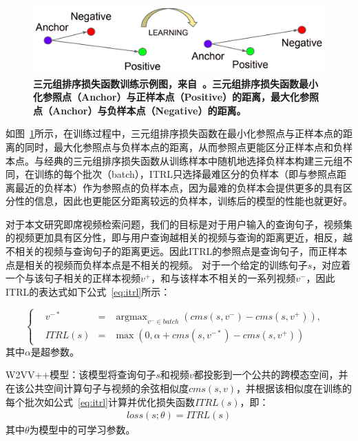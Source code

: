 \begin{figure}[tbh!]
    \centering
    \includegraphics[width=\linewidth]{figures/triplet-ranking-loss}
    \caption[三元组排序损失函数训练示例图]{\textbf{三元组排序损失函数训练示例图，来自~\cite{schroff2015facenet}。三元组排序损失函数最小化参照点（Anchor）与正样本点（Positive）的距离，最大化参照点（Anchor）与负样本点（Negative）的距离。}}
    \label{fig:triplet-ranking-loss}
\end{figure}

如图~\ref{fig:triplet-ranking-loss}所示，在训练过程中，三元组排序损失函数在最小化参照点与正样本点的距离的同时，最大化参照点与负样本点的距离，从而参照点更能区分正样本点和负样本点。与经典的三元组排序损失函数从训练样本中随机地选择负样本构建三元组不同，在训练的每个批次（batch），ITRL只选择最难区分的负样本（即与参照点距离最近的负样本）作为参照点的负样本点，因为最难的负样本会提供更多的具有区分性的信息，因此也更能区分距离较远的负样本，训练后的模型的性能也就更好。

对于本文研究即席视频检索问题，我们的目标是对于用户输入的查询句子，视频集的视频更加具有区分性，即与用户查询越相关的视频与查询的距离更近，相反，越不相关的视频与查询句子的距离更远。因此ITRL的参照点是查询句子，而正样本点是相关的视频而负样本点是不相关的视频。
对于一个给定的训练句子$s$，对应着一个与该句子相关的正样本视频$v^+$，和与该样本不相关的一系列视频$v^-$，因此ITRL的表达式如下公式~\ref{eq:itrl}所示：

\begin{equation}
    \label{eq:itrl}
    \left\{
        \begin{aligned}
            & v^{-*} & = & \mathop{\arg\max}_{v^- \in batch}(cms(s, v^-) - cms(s, v^+)), & \\
            & ITRL(s) & = & \max(0, \alpha + cms(s, v^{-*}) - cms(s, v^+)) &
        \end{aligned}
    \right.
\end{equation}
其中$\alpha$是超参数。

W2VV++模型：该模型将查询句子$s$和视频$v$都投影到一个公共的跨模态空间，并在该公共空间计算句子与视频的余弦相似度$cms(s,v)$，并根据该相似度在训练的每个批次如公式~\ref{eq:itrl}计算并优化损失函数$ITRL(s)$，即：
\begin{equation}
    \label{eq:loss-w2vv++}
    \begin{aligned}
        loss(s;\theta) = ITRL(s)
    \end{aligned}
\end{equation}
其中$\theta$为模型中的可学习参数。

